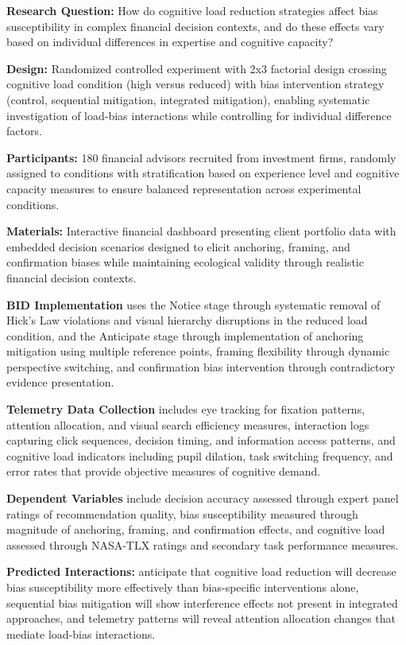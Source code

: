 \documentclass[
  authoryear,
  preprint]{elsarticle}
\begin{document}
\textbf{Research Question:} How do cognitive load reduction strategies
affect bias susceptibility in complex financial decision contexts, and
do these effects vary based on individual differences in expertise and
cognitive capacity?

\textbf{Design:} Randomized controlled experiment with 2x3 factorial
design crossing cognitive load condition (high versus reduced) with bias
intervention strategy (control, sequential mitigation, integrated
mitigation), enabling systematic investigation of load-bias interactions
while controlling for individual difference factors.

\textbf{Participants:} 180 financial advisors recruited from investment
firms, randomly assigned to conditions with stratification based on
experience level and cognitive capacity measures to ensure balanced
representation across experimental conditions.

\textbf{Materials:} Interactive financial dashboard presenting client
portfolio data with embedded decision scenarios designed to elicit
anchoring, framing, and confirmation biases while maintaining ecological
validity through realistic financial decision contexts.

\textbf{BID Implementation} uses the Notice stage through systematic
removal of Hick's Law violations and visual hierarchy disruptions in the
reduced load condition, and the Anticipate stage through implementation
of anchoring mitigation using multiple reference points, framing
flexibility through dynamic perspective switching, and confirmation bias
intervention through contradictory evidence presentation.

\textbf{Telemetry Data Collection} includes eye tracking for fixation
patterns, attention allocation, and visual search efficiency measures,
interaction logs capturing click sequences, decision timing, and
information access patterns, and cognitive load indicators including
pupil dilation, task switching frequency, and error rates that provide
objective measures of cognitive demand.

\textbf{Dependent Variables} include decision accuracy assessed through
expert panel ratings of recommendation quality, bias susceptibility
measured through magnitude of anchoring, framing, and confirmation
effects, and cognitive load assessed through NASA-TLX ratings and
secondary task performance measures.

\textbf{Predicted Interactions:} anticipate that cognitive load
reduction will decrease bias susceptibility more effectively than
bias-specific interventions alone, sequential bias mitigation will show
interference effects not present in integrated approaches, and telemetry
patterns will reveal attention allocation changes that mediate load-bias
interactions.
\end{document}
